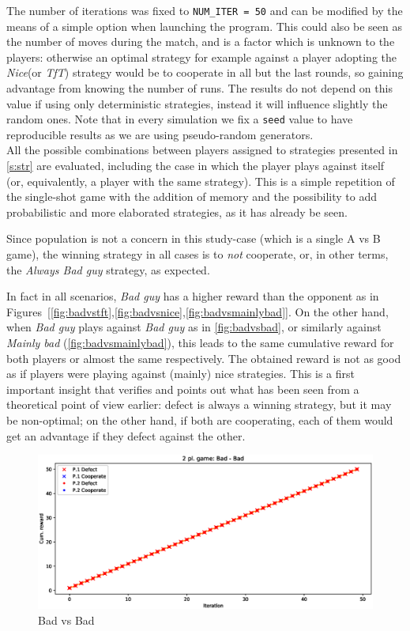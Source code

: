 \documentclass[journal,a4paper,10pt,twoside]{IEEEtran} %
\begin{document}
The number of iterations was fixed to \texttt{NUM\_ITER = 50} and can be modified by the means of a simple option when launching the program. This could also be seen as the number of moves during the match, and is a factor which is unknown to the players: otherwise an optimal strategy for example against a player adopting the \textit{Nice}(or \textit{TfT}) strategy would be to cooperate in all but the last rounds, so gaining advantage from knowing the number of runs. The results do not depend on this value if using only deterministic strategies, instead it will influence slightly the random ones. Note that in every simulation we fix a \texttt{seed} value to have reproducible results as we are using pseudo-random generators.
\\

All the possible combinations between players assigned to strategies presented in \autoref{s:str} are evaluated, including the case in which the player plays against itself (or, equivalently, a player with the same strategy).
This is a simple repetition of the single-shot game with the addition of memory and the possibility to add probabilistic and more elaborated strategies, as it has already be seen.

Since population is not a concern in this study-case (which is a single A vs B game), the winning strategy in all cases is to \textit{not} cooperate, or, in other terms, the \textit{Always Bad guy} strategy, as expected.

In fact in all scenarios, \textit{Bad guy} has a higher reward than the opponent as in Figures~[\ref{fig:badvstft},\ref{fig:badvsnice},\ref{fig:badvsmainlybad}]. 
On the other hand, when \textit{Bad guy} plays against \textit{Bad guy} as in \autoref{fig:badvsbad}, or similarly against \textit{Mainly bad} (\autoref{fig:badvsmainlybad}), this leads to the same cumulative reward for both players or almost the same respectively. The obtained reward is not as good as if players were playing against (mainly) nice strategies. This is a first important insight that verifies and points out what has been seen from a theoretical point of view earlier: defect is always a winning strategy, but it may be non-optimal; on the other hand, if both are cooperating, each of them would get an advantage if they defect against the other.

\begin{figure}[!ht]
    \centering
    \includegraphics[width=1\columnwidth]{../img/ipd2p/ipd2p-rewards-Bad-Bad}
    \caption{Bad vs Bad}
    \label{fig:badvsbad}
\end{figure}
\end{document}
